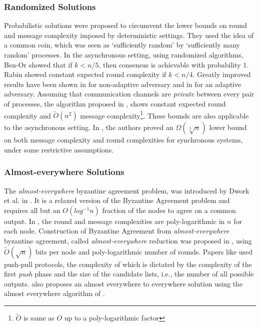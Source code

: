 \subsubsection{Randomized Solutions}
Probabilistic solutions were proposed to circumvent the lower bounds on round and message complexity imposed by deterministic settings. They used the idea of a common coin, which was seen as `sufficiently random' by `sufficiently many random' processes. 
In the asynchronous setting, using randomized algorithms, Ben-Or \cite{Ben-Or83} showed that if $k < n/5$, then consensus is achievable with probability $1$. Rabin \cite{Rabin83} showed constant expected round complexity if $k < n/4$. Greatly improved results have been shown in \cite{PCR14, KKKSS08, MHR14} for non-adaptive adversary and in \cite{KS13,AAKS14} for an adaptive adversary. Assuming that communication channels are \textit{private} between every pair of processes, the algorithm proposed in \cite{PR10}, shows constant expected round complexity and $\tilde{O}(n^2)$ message complexity\footnote{$\tilde{O}$ is same as $O$ up to a poly-logarithmic factor}. These bounds are also applicable to the asynchronous setting. In \cite{HKK08}, the authors proved an $\Omega(\sqrt[3]{n})$ lower bound on both message complexity and round complexities for synchronous systems, under some restrictive assumptions.

\subsubsection{Almost-everywhere Solutions}
The \textit{almost-everywhere} byzantine agreement problem, was introduced by Dwork et al. in \cite{DPPU88}. It is a relaxed version of the Byzantine Agreement problem and requires all but an $O(log^{-1}n)$ fraction of the nodes to agree on a common output. In \cite{KSSV06}, the round and message complexities are poly-logarithmic in $n$ for each node. Construction of Byzantine Agreement from \textit{almost-everywhere} byzantine agreement, called \textit{almost-everywhere} reduction was proposed in \cite{KS09,KLST11}, using $\tilde{O}(\sqrt{n})$ bits per node and poly-logarithmic number of rounds. 
Papers like \cite{KLST11} used push-pull protocols, the complexity of which is dictated by the complexity of the first \textit{push} phase and the size of the candidate lists, i.e., the number of all possible outputs. \cite{BGH13}  also proposes an almost everywhere to everywhere solution using the almost everywhere algorithm of \cite{KSSV06}.

